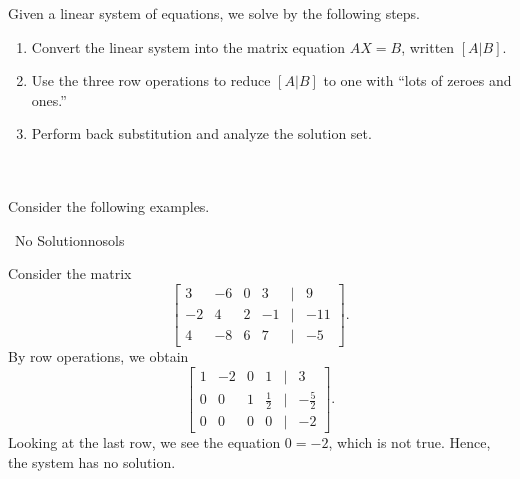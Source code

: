         Given a linear system of equations, we solve by the following steps.
        \begin{enumerate}
            \item Convert the linear system into the matrix equation \(AX=B\), written \([A|B]\).
            \item Use the three row operations to reduce \([A|B]\) to one with ``lots of zeroes and ones.''
            \item Perform back substitution and analyze the solution set.
        \end{enumerate}
        \vphantom
        \\
        \\
        Consider the following examples.
        \begin{example}{\Difficulty\,\Difficulty\,\,No Solution}{nosols}
            
            Consider the matrix
            \begin{equation*}
                \begin{bmatrix} 
                3 & -6 & 0 & 3 & | & 9 \\
                -2 & 4 & 2 & -1 & | & -11 \\
                4 & -8 & 6 & 7 & | & -5
                \end{bmatrix}.
            \end{equation*}
            By row operations, we obtain
            \begin{equation*}
                \begin{bmatrix} 
                1 & -2 & 0 & 1 & | & 3 \\
                0 & 0 & 1 & \frac{1}{2} & | & -\frac{5}{2} \\
                0 & 0 & 0 & 0 & | & -2
                \end{bmatrix}.
            \end{equation*}
            Looking at the last row, we see the equation \(0=-2\), which is not true. Hence, the system has no solution.
            
        \end{example}
